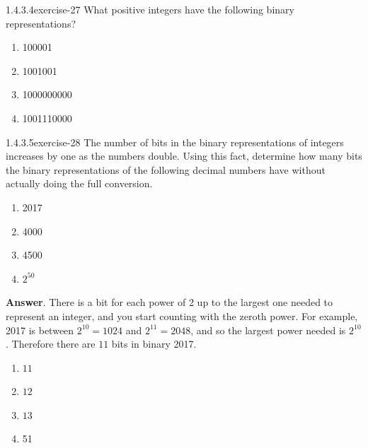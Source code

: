 \documentclass[twoside,10pt,]{book}
\numberwithin{equation}{section}
\begin{document}
\begin{divisionsolution}{1.4.3.4}{}{exercise-27}%
\hypertarget{p-456}{}%
What positive integers have the following binary representations?\leavevmode%
\begin{multicols}{2}
\begin{enumerate}[label=(\alph*)]
\item\hypertarget{li-334}{}\hypertarget{p-457}{}%
100001%
\item\hypertarget{li-335}{}\hypertarget{p-458}{}%
1001001%
\item\hypertarget{li-336}{}\hypertarget{p-459}{}%
1000000000%
\item\hypertarget{li-337}{}\hypertarget{p-460}{}%
1001110000%
\end{enumerate}
\end{multicols}
%
\end{divisionsolution}%
\begin{divisionsolution}{1.4.3.5}{}{exercise-28}%
\hypertarget{p-461}{}%
The number of bits in the binary representations of integers increases by one as the numbers double.  Using this fact, determine how many bits the binary representations of the following decimal numbers have without actually doing the full conversion.\leavevmode%
\begin{multicols}{4}
\begin{enumerate}[label=(\alph*)]
\item\hypertarget{li-338}{}\hypertarget{p-462}{}%
2017%
\item\hypertarget{li-339}{}\hypertarget{p-463}{}%
4000%
\item\hypertarget{li-340}{}\hypertarget{p-464}{}%
4500%
\item\hypertarget{li-341}{}\hypertarget{p-465}{}%
\(2^{50}\)%
\end{enumerate}
\end{multicols}
%
\par\smallskip%
\noindent\textbf{Answer}.\quad%
\hypertarget{p-466}{}%
There is a bit for each power of 2 up to the largest one needed to represent an integer, and you start counting with the zeroth power. For example, 2017 is between \(2^{10}=1024\) and \(2^{11}=2048\), and so the largest power needed is \(2^{10}\). Therefore there are \(11\) bits in binary 2017.%
\par
\hypertarget{p-467}{}%
\leavevmode%
\begin{multicols}{2}
\begin{enumerate}[label=(\alph*)]
\item\hypertarget{li-342}{}\hypertarget{p-468}{}%
\(11\)%
\item\hypertarget{li-343}{}\hypertarget{p-469}{}%
\(12\)%
\item\hypertarget{li-344}{}\hypertarget{p-470}{}%
\(13\)%
\item\hypertarget{li-345}{}\hypertarget{p-471}{}%
51%
\end{enumerate}
\end{multicols}
%
\end{divisionsolution}%
\end{document}
